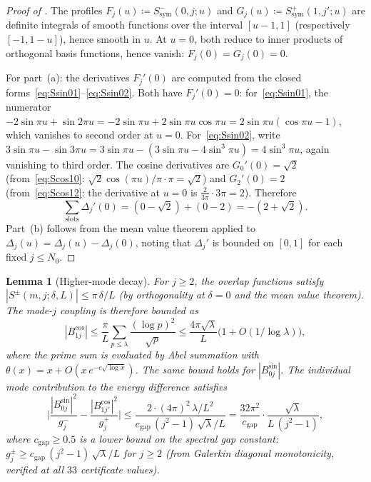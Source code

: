 \documentclass[12pt,a4paper]{article}
\newtheorem{lemma}[theorem]{Lemma}
\theoremstyle{definition}
\theoremstyle{remark}
\begin{document}
\begin{proof}[Proof of ]
The profiles $F_j(u) \coloneqq S^-_{\mathrm{sym}}(0,j;u)$ and $G_j(u) \coloneqq S^+_{\mathrm{sym}}(1,j';u)$ are definite integrals of smooth functions over the interval $[u-1,1]$ (respectively $[-1,1-u]$), hence smooth in $u$. At $u = 0$, both reduce to inner products of orthogonal basis functions, hence vanish: $F_j(0) = G_j(0) = 0$.

For part~(a): the derivatives $F_j'(0)$ are computed from the closed forms~\eqref{eq:Ssin01}--\eqref{eq:Ssin02}. Both have $F_j'(0) = 0$: for~\eqref{eq:Ssin01}, the numerator $-2\sin\pi u + \sin 2\pi u = -2\sin\pi u + 2\sin\pi u\cos\pi u = 2\sin\pi u(\cos\pi u - 1)$, which vanishes to second order at $u = 0$. For~\eqref{eq:Ssin02}, write $3\sin\pi u - \sin 3\pi u = 3\sin\pi u - (3\sin\pi u - 4\sin^3\pi u) = 4\sin^3\pi u$, again vanishing to third order. The cosine derivatives are $G_0'(0) = \sqrt{2}$ (from~\eqref{eq:Scos10}: $\sqrt{2}\cos(\pi u)/\pi \cdot \pi = \sqrt{2}$) and $G_2'(0) = 2$ (from~\eqref{eq:Scos12}: the derivative at $u = 0$ is $\tfrac{2}{3\pi}\cdot 3\pi = 2$). Therefore
\[
  \sum_{\mathrm{slots}} \Delta_j'(0) = (0 - \sqrt{2}) + (0 - 2) = -(2 + \sqrt{2}).
\]
Part~(b) follows from the mean value theorem applied to $\Delta_j(u) = \Delta_j(u) - \Delta_j(0)$, noting that $\Delta_j'$ is bounded on $[0,1]$ for each fixed $j \leq N_0$.
\end{proof}

\begin{lemma}[Higher-mode decay]
\label{lem:higher-mode-decay}
For $j \geq 2$, the overlap functions satisfy $|S^{\pm}(m,j;\delta,L)| \leq \pi\,\delta/L$ (by orthogonality at $\delta = 0$ and the mean value theorem). The mode-$j$ coupling is therefore bounded as
\[
  |B_{1j}^{\cos}| \leq \frac{\pi}{L}\sum_{p \leq \lambda}\frac{(\log p)^2}{\sqrt{p}}
  \leq \frac{4\pi\sqrt{\lambda}}{L}\bigl(1 + O(1/\log\lambda)\bigr),
\]
where the prime sum is evaluated by Abel summation with $\theta(x) = x + O(x\,e^{-c\sqrt{\log x}})$. The same bound holds for $|B_{0j}^{\sin}|$. The individual mode contribution to the energy difference satisfies
\[
  \biggl|\frac{|B_{0j}^{\sin}|^2}{g_j^-} - \frac{|B_{1j'}^{\cos}|^2}{g_j^+}\biggr|
  \leq \frac{2 \cdot (4\pi)^2 \,\lambda/L^2}{c_{\mathrm{gap}}\,(j^2-1)\,\sqrt{\lambda}/L}
  = \frac{32\pi^2}{c_{\mathrm{gap}}}\cdot\frac{\sqrt{\lambda}}{L\,(j^2-1)},
\]
where $c_{\mathrm{gap}} \geq 0.5$ is a lower bound on the spectral gap constant: $g_j^{\pm} \geq c_{\mathrm{gap}}\,(j^2-1)\,\sqrt{\lambda}/L$ for $j \geq 2$ (from Galerkin diagonal monotonicity, verified at all $33$ certificate values).
\end{lemma}
\end{document}
